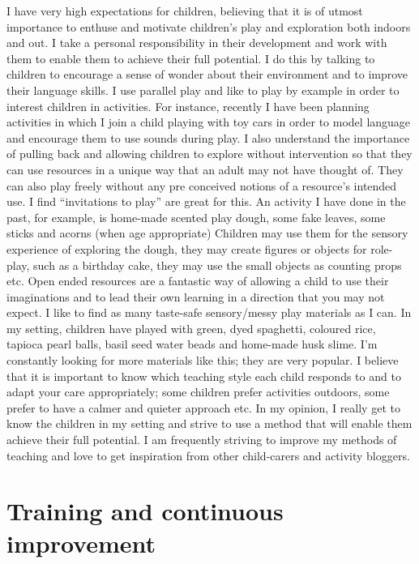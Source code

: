 \documentclass[10pt,a4paper]{report}
\begin{document}
I have very high expectations for children, believing that it is of utmost importance to enthuse and motivate children's play and exploration both indoors and out. I take a personal responsibility in their development and work with them to enable them to achieve their full potential. I do this by talking to children to encourage a sense of wonder about their environment and to improve their language skills. I use parallel play and like to play by example in order to interest children in activities. For instance, recently I have been planning activities in which I join a child playing with toy cars in order to model language and encourage them to use sounds during play. I also understand the importance of pulling back and allowing children to explore without intervention so that they can use resources in a unique way that an adult may not have thought of. They can also play freely without any pre conceived notions of a resource's intended use. I find “invitations to play” are great for this. An activity I have done in the past, for example, is home-made scented play dough, some fake leaves, some sticks and acorns (when age appropriate) Children may use them for the sensory experience of exploring the dough, they may create figures or objects for role-play, such as a birthday cake, they may use the small objects as counting props etc. Open ended resources are a fantastic way of allowing a child to use their imaginations and to lead their own learning in a direction that you may not expect. I like to find as many taste-safe sensory/messy play materials as I can. In my setting, children have played with green, dyed spaghetti, coloured rice, tapioca pearl balls, basil seed water beads and home-made husk slime. I'm constantly looking for more materials like this; they are very popular. I believe that it is important to know which teaching style each child responds to and to adapt your care appropriately; some children prefer activities outdoors, some prefer to have a calmer and quieter approach etc. In my opinion, I really get to know the children in my setting and strive to use a method that will enable them achieve their full potential. I am frequently striving to improve my methods of teaching and love to get inspiration from other child-carers and activity bloggers.

\section{Training and continuous improvement}
\end{document}

